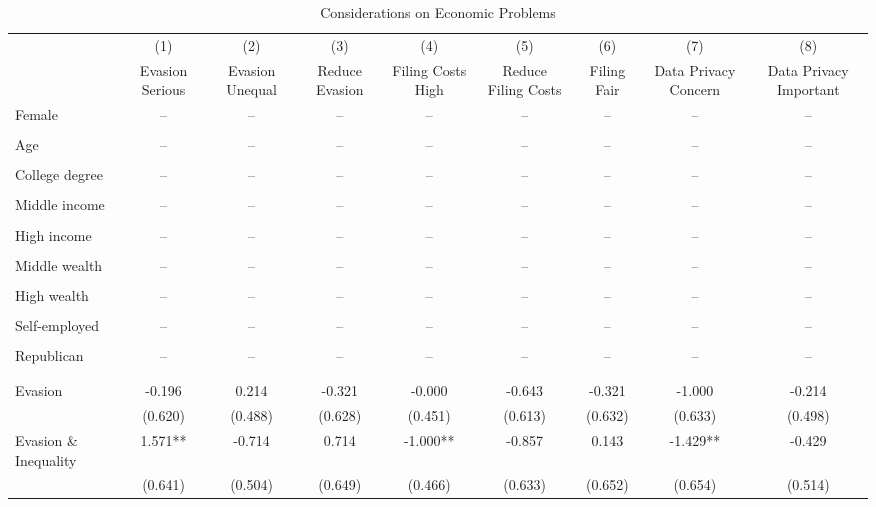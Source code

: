 \documentclass[11pt]{article}
\begin{document}
\FloatBarrier
\begin{landscape}
\begin{table}[!htbp]\centering
\caption{Considerations on Economic Problems}
\label{tab:considerationseconomicproblems_noc}
\begin{threeparttable}
\footnotesize
\begin{tabular}{l|cccccccc}
\toprule
& (1) & (2) & (3) & (4) & (5) & (6) & (7) & (8) \\
& Evasion Serious & Evasion Unequal & Reduce Evasion & Filing Costs High & Reduce Filing Costs & Filing Fair & Data Privacy Concern & Data Privacy Important \\
\midrule
Female & -- & -- & -- & -- & -- & -- & -- & -- \\
 &  &  &  &  &  &  &  &  \\
Age & -- & -- & -- & -- & -- & -- & -- & -- \\
 &  &  &  &  &  &  &  &  \\
College degree & -- & -- & -- & -- & -- & -- & -- & -- \\
 &  &  &  &  &  &  &  &  \\
Middle income & -- & -- & -- & -- & -- & -- & -- & -- \\
 &  &  &  &  &  &  &  &  \\
High income & -- & -- & -- & -- & -- & -- & -- & -- \\
 &  &  &  &  &  &  &  &  \\
Middle wealth & -- & -- & -- & -- & -- & -- & -- & -- \\
 &  &  &  &  &  &  &  &  \\
High wealth & -- & -- & -- & -- & -- & -- & -- & -- \\
 &  &  &  &  &  &  &  &  \\
Self-employed & -- & -- & -- & -- & -- & -- & -- & -- \\
 &  &  &  &  &  &  &  &  \\
Republican & -- & -- & -- & -- & -- & -- & -- & -- \\
 &  &  &  &  &  &  &  &  \\
\\[0.5em]
Evasion & -0.196 & 0.214 & -0.321 & -0.000 & -0.643 & -0.321 & -1.000 & -0.214 \\
 & (0.620) & (0.488) & (0.628) & (0.451) & (0.613) & (0.632) & (0.633) & (0.498) \\
Evasion \& Inequality & 1.571** & -0.714 & 0.714 & -1.000** & -0.857 & 0.143 & -1.429** & -0.429 \\
 & (0.641) & (0.504) & (0.649) & (0.466) & (0.633) & (0.652) & (0.654) & (0.514) \\

\end{tabular}
\end{threeparttable}
\end{table}
\end{landscape}
\end{document}
